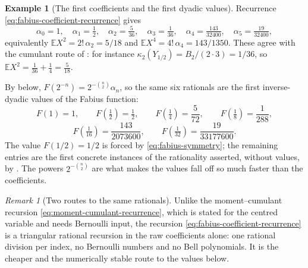 \documentclass[11pt,oneside,openany]{book}
\theoremstyle{definition}
\newtheorem{example}[example]{Example}
\theoremstyle{remark}
\newtheorem{remark}[remark]{Remark}
\begin{document}
\begin{example}[The first coefficients and the first dyadic values]\label{ex:fabius-first-coefficients}
Recurrence \eqref{eq:fabius-coefficient-recurrence} gives
\[
 \alpha_0=1,\quad
 \alpha_1=\tfrac12,\quad
 \alpha_2=\tfrac5{36},\quad
 \alpha_3=\tfrac1{36},\quad
 \alpha_4=\tfrac{143}{32400},\quad
 \alpha_5=\tfrac{19}{32400},
\]
equivalently $\mathbb EX^2=2!\,\alpha_2=5/18$ and $\mathbb EX^4=4!\,\alpha_4=143/1350$.
These agree with the cumulant route of
: for instance
$\kappa_2(Y_{1/2})=B_2/(2\cdot3)=1/36$, so $\mathbb EX^2=\tfrac1{36}+\tfrac14=\tfrac5{18}$.

By  below, $F(2^{-n})=2^{-\binom n2}\alpha_n$, so the same
six rationals are the first inverse-dyadic values of the Fabius function:
\[
 F(1)=1,\qquad
 F\!\left(\tfrac12\right)=\tfrac12,\qquad
 F\!\left(\tfrac14\right)=\frac5{72},\qquad
 F\!\left(\tfrac18\right)=\frac1{288},
\]
\[
 F\!\left(\tfrac1{16}\right)=\frac{143}{2073600},\qquad
 F\!\left(\tfrac1{32}\right)=\frac{19}{33177600}.
\]
The value $F(1/2)=1/2$ is forced by \eqref{eq:fabius-symmetry}; the remaining entries
are the first concrete instances of the rationality asserted, without values, by
.  The powers $2^{-\binom n2}$ are what makes the values
fall off so much faster than the coefficients.
\end{example}

\begin{remark}[Two routes to the same rationals]\label{rem:moment-routes}
Unlike the moment--cumulant recursion \eqref{eq:moment-cumulant-recurrence}, which is
stated for the centred variable and needs Bernoulli input, the recursion
\eqref{eq:fabius-coefficient-recurrence} is a triangular rational recursion in the raw
coefficients alone: one rational division per index, no Bernoulli numbers and no Bell
polynomials.  It is the cheaper and the numerically stable route to the values below.
\end{remark}
\end{document}
